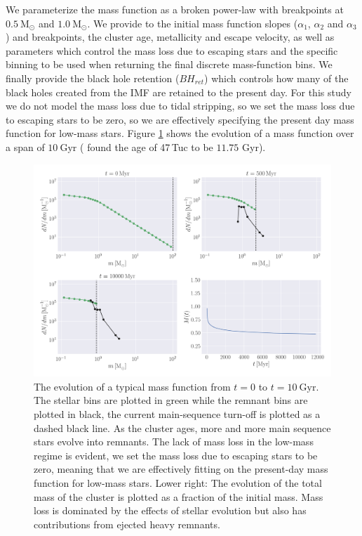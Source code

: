 We parameterize the mass function as a broken power-law with breakpoints at $0.5 \ \mathrm{M}_\odot$
and $1.0 \ \mathrm{M}_\odot$. We provide to \evolvemf{} the initial mass function slopes
($\alpha_1$, $\alpha_2$ and $\alpha_3$) and breakpoints, the cluster age, metallicity and escape
velocity, as well as parameters which control the mass loss due to escaping stars and the specific
binning to be used when returning the final discrete mass-function bins. We finally provide the
black hole retention ($BH_{ret}$) which controls how many of the black holes created from the IMF are
retained to the present day. For this study we do not model the mass loss due to tidal stripping, so
we set the mass loss due to escaping stars to be zero, so we are effectively specifying the present
day mass function for low-mass stars. Figure \ref{fig:2/evolve_mf} shows the evolution of a mass
function over a span of $10 \ \mathrm{Gyr}$ (\citealt{Baumgardt2017a} found the age of 47\,Tuc to be
$11.75$ Gyr).

\begin{figure}
    \centering
    \includegraphics[width=\textwidth]{figures/evolve_mf.png}
    \caption{The evolution of a typical mass function from $t=0$ to $t=10 \ \mathrm{Gyr}$. The
        stellar bins are plotted in green while the remnant bins are plotted in black, the current
        main-sequence turn-off is plotted as a dashed black line. As the cluster ages, more and more
        main sequence stars evolve into remnants. The lack of mass loss in the low-mass regime is
        evident, we set the mass loss due to escaping stars to be zero, meaning that we are
        effectively fitting on the present-day mass function for low-mass stars. Lower right: The
        evolution of the total mass of the cluster is plotted as a fraction of the initial mass.
        Mass loss is dominated by the effects of stellar evolution but also has contributions from
        ejected heavy remnants. }
    \label{fig:2/evolve_mf}
\end{figure}


